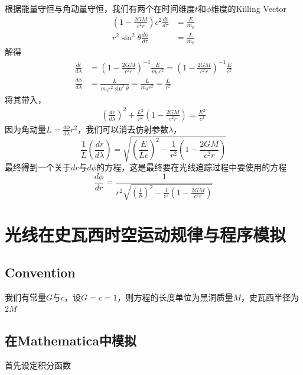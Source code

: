 根据能量守恒与角动量守恒，我们有两个在时间维度$t$和$\phi$维度的Killing Vector
\begin{equation}
    \begin{split}
        \left(1-\frac{2GM}{c^{2}r}\right)c^{2}\frac{dt}{d\tau}&=\frac{E}{m_{0}}\\
        r^{2}\sin^{2}\theta\frac{d\phi}{d\tau}&=\frac{L}{m_{0}}
    \end{split}
\end{equation}
解得
\begin{equation}
    \begin{split}
        \frac{dt}{d\lambda}&=\left(1-\frac{2GM}{c^{2}r}\right)^{-1}\frac{E}{m_{0}c^{2}}=\left(1-\frac{2GM}{c^{2}r}\right)^{-1}\frac{E}{c^{2}}\\\frac{d\phi}{d\lambda}&=\frac{L}{m_{0}r^{2}\sin^{2}\theta}=\frac{L}{m_{0}r^{2}}=\frac{L}{r^{2}}
    \end{split}
\end{equation}
将其带入，
\begin{equation}
    \begin{split}
        \left(\frac{dr}{d\lambda}\right)^{2}+\frac{L^{2}}{r^{2}}\left(1-\frac{2GM}{c^{2}r}\right)=\frac{E^{2}}{c^{2}}
    \end{split}
\end{equation}
因为角动量$L=\frac{d\phi}{d\lambda}r^{2}$，我们可以消去仿射参数$\lambda$，
\begin{equation}
    \frac{1}{L}\left(\frac{dr}{d\lambda}\right)=\sqrt{\left(\frac{E}{Lc}\right)^{2}-\frac{1}{r^{2}}\left(1-\frac{2GM}{c^{2}r}\right)}
\end{equation}
最终得到一个关于$dr$与$d\phi$的方程，这是最终要在光线追踪过程中要使用的方程
\begin{equation}
    \frac{d\phi}{dr}=\frac{1}{r^{2}\sqrt{\left(\frac{1}{b}\right)^{2}-\frac{1}{r^{2}}\left(1-\frac{2GM}{c^{2}r}\right)}}\label{eq:geodesic}
\end{equation}

\section{光线在史瓦西时空运动规律与程序模拟}
\subsection{Convention}
我们有常量$G$与$c$，设$G=c=1$，则方程的长度单位为黑洞质量$M$，史瓦西半径为$2M$
\subsection{在Mathematica中模拟}
首先设定积分函数

